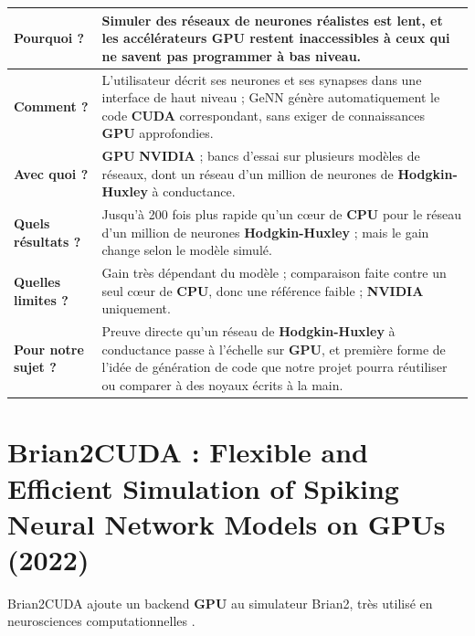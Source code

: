 \documentclass{report}
\begin{document}
\medskip
\begin{tabular}{|p{3.2cm}|p{11.2cm}|}
\hline
\textbf{Pourquoi ?} & Simuler des réseaux de neurones réalistes est lent, et les accélérateurs \textbf{GPU} restent inaccessibles à ceux qui ne savent pas programmer à bas niveau. \\ \hline
\textbf{Comment ?} & L'utilisateur décrit ses neurones et ses synapses dans une interface de haut niveau ; GeNN génère automatiquement le code \textbf{CUDA} correspondant, sans exiger de connaissances \textbf{GPU} approfondies. \\ \hline
\textbf{Avec quoi ?} & \textbf{GPU} \textbf{NVIDIA} ; bancs d'essai sur plusieurs modèles de réseaux, dont un réseau d'un million de neurones de \textbf{Hodgkin-Huxley} à conductance. \\ \hline
\textbf{Quels résultats ?} & Jusqu'à 200 fois plus rapide qu'un cœur de \textbf{CPU} pour le réseau d'un million de neurones \textbf{Hodgkin-Huxley} ; mais le gain change selon le modèle simulé. \\ \hline
\textbf{Quelles limites ?} & Gain très dépendant du modèle ; comparaison faite contre un seul cœur de \textbf{CPU}, donc une référence faible ; \textbf{NVIDIA} uniquement. \\ \hline
\textbf{Pour notre sujet ?} & Preuve directe qu'un réseau de \textbf{Hodgkin-Huxley} à conductance passe à l'échelle sur \textbf{GPU}, et première forme de l'idée de génération de code que notre projet pourra réutiliser ou comparer à des noyaux écrits à la main. \\ \hline
\end{tabular}

\section{Brian2CUDA : Flexible and Efficient Simulation of Spiking Neural Network Models on GPUs (2022)}

Brian2CUDA ajoute un backend \textbf{GPU} au simulateur Brian2, très utilisé en neurosciences computationnelles \cite{alevi2022}.
\end{document}

